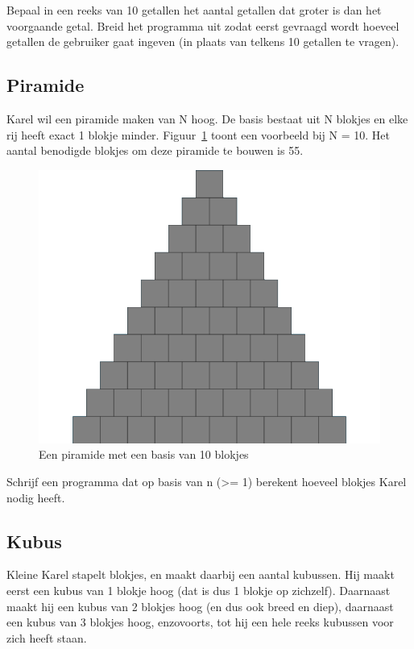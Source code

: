 Bepaal in een reeks van 10 getallen het aantal getallen dat groter is dan het voorgaande getal. Breid het programma uit zodat eerst gevraagd wordt hoeveel getallen de gebruiker gaat ingeven (in plaats van telkens 10 getallen te vragen).

\subsection{Piramide}

Karel wil een piramide maken van N hoog. De basis bestaat uit N blokjes en elke rij heeft exact 1 blokje minder. Figuur~\ref{fig:piramide} toont een voorbeeld bij N = 10. Het aantal benodigde blokjes om deze piramide te bouwen is 55.

\begin{figure}
\centering
\includegraphics[scale=0.5]{Oefeningen/blokjes.png}
\caption{Een piramide met een basis van 10 blokjes}\label{fig:piramide}
\end{figure}

Schrijf een programma dat op basis van n (>= 1) berekent hoeveel blokjes Karel nodig heeft.

\subsection{Kubus}

Kleine Karel stapelt blokjes, en maakt daarbij een aantal kubussen. Hij maakt eerst een kubus van 1 blokje hoog (dat is dus 1 blokje op zichzelf). Daarnaast maakt hij een kubus van 2 blokjes hoog (en dus ook breed en diep), daarnaast een kubus van 3 blokjes hoog, enzovoorts, tot hij een hele reeks kubussen voor zich heeft staan.

